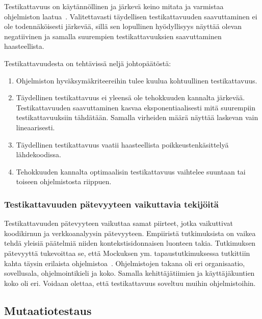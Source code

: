 \documentclass[finnish]{../tktltiki2}
\theoremstyle{definition}
\theoremstyle{remark}
\begin{document}
    Testikattavuus on käytännöllinen ja järkevä keino mitata ja varmistaa ohjelmiston laatua~\cite{MNDT09}. 
Valitettavasti täydellisen testikattavuuden saavuttaminen ei ole todennäköisesti järkevää, sillä sen lopullinen 
hyödyllisyys näyttää olevan negatiivinen ja samalla suurempien testikattavuuksien saavuttaminen haasteellista.\newline

\noindent Testikattavuudesta on tehtävissä neljä johtopäätöstä:
    
\begin{enumerate}

    \item Ohjelmiston hyväksymäkriteereihin tulee kuulua kohtuullinen testikattavuus.
          
    \item Täydellinen testikattavuus ei yleensä ole tehokkuuden kannalta järkevää. Testikattavuuden saavuttaminen kasvaa 
          eksponentiaalisesti mitä suurempiin testikattavuuksiin tähdätään. Samalla virheiden määrä näyttää laskevan 
          vain lineaarisesti.
          
    \item Täydellinen testikattavuus vaatii haasteellista poikkeustenkäsittelyä lähde\-koodissa.
    
    \item Tehokkuuden kannalta optimaalisin testikattavuus vaihtelee suuntaan tai toiseen ohjelmistosta riippuen.

\end{enumerate}

\subsubsection{Testikattavuuden pätevyyteen vaikuttavia tekijöitä}

Testikattavuuden pätevyyteen vaikuttaa samat piirteet, jotka vaikuttivat koodikirnun ja verkkoanalyysin pätevyyteen. 
Empiiristä tutkimuksista on vaikea tehdä yleisiä päätelmiä niiden kontekstisidonnaisen luonteen takia. Tutkimuksen 
pätevyyttä tukevoittaa se, että Mockuksen ym. tapaustutkimuksessa tutkittiin kahta täysin erilaista 
ohjelmistoa~\cite{MNDT09}. Ohjelmistojen takana oli eri organisaatio, sovellusala, ohjelmointikieli ja koko. Samalla 
kehittäjätiimien ja käyttäjäkuntien koko oli eri. Voidaan olettaa, että testikattavuus soveltuu muihin ohjelmistoihin.

\subsection{Mutaatiotestaus}
\end{document}
